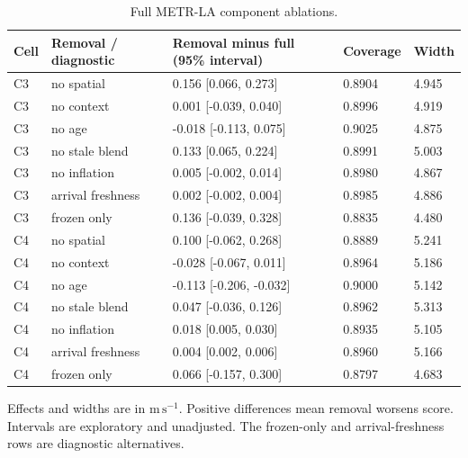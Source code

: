 \documentclass[pdflatex,sn-mathphys-num]{sn-jnl}
\newcommand{\ms}{\mathrm{m\,s^{-1}}}
\begin{document}
\begin{table}[!htbp]
\caption{Full METR-LA component ablations.}\label{tab:ablation-metr}
\centering\setlength{\tabcolsep}{3pt}\small
\begin{tabular}{lllll}\toprule
Cell & Removal / diagnostic & Removal minus full (95\% interval) & Coverage & Width \\\midrule
C3 & no spatial & 0.156 [0.066, 0.273] & 0.8904 & 4.945 \\
C3 & no context & 0.001 [-0.039, 0.040] & 0.8996 & 4.919 \\
C3 & no age & -0.018 [-0.113, 0.075] & 0.9025 & 4.875 \\
C3 & no stale blend & 0.133 [0.065, 0.224] & 0.8991 & 5.003 \\
C3 & no inflation & 0.005 [-0.002, 0.014] & 0.8980 & 4.867 \\
C3 & arrival freshness & 0.002 [-0.002, 0.004] & 0.8985 & 4.886 \\
C3 & frozen only & 0.136 [-0.039, 0.328] & 0.8835 & 4.480 \\
C4 & no spatial & 0.100 [-0.062, 0.268] & 0.8889 & 5.241 \\
C4 & no context & -0.028 [-0.067, 0.011] & 0.8964 & 5.186 \\
C4 & no age & -0.113 [-0.206, -0.032] & 0.9000 & 5.142 \\
C4 & no stale blend & 0.047 [-0.036, 0.126] & 0.8962 & 5.313 \\
C4 & no inflation & 0.018 [0.005, 0.030] & 0.8935 & 5.105 \\
C4 & arrival freshness & 0.004 [0.002, 0.006] & 0.8960 & 5.166 \\
C4 & frozen only & 0.066 [-0.157, 0.300] & 0.8797 & 4.683 \\
\bottomrule\end{tabular}
\par\smallskip\footnotesize Effects and widths are in $\ms$. Positive differences mean removal worsens score. Intervals are exploratory and unadjusted. The frozen-only and arrival-freshness rows are diagnostic alternatives.
\end{table}
\FloatBarrier
\end{document}
